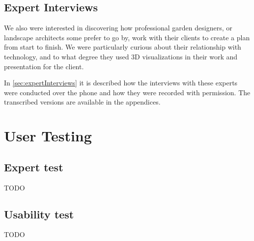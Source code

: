 \subsection{Expert Interviews}
We also were interested in discovering how professional garden designers, or landscape architects some prefer to go by, work with their clients to create a plan from start to finish. We were particularly curious about their relationship with technology, and to what degree they used 3D visualizations in their work and presentation for the client. 

In \autoref{sec:expertInterviews} it is described how the interviews with these experts were conducted over the phone and how they were recorded with permission. The transcribed versions are available in the appendices. 

\section{User Testing}

\subsection{Expert test}
TODO
\subsection{Usability test}
TODO
